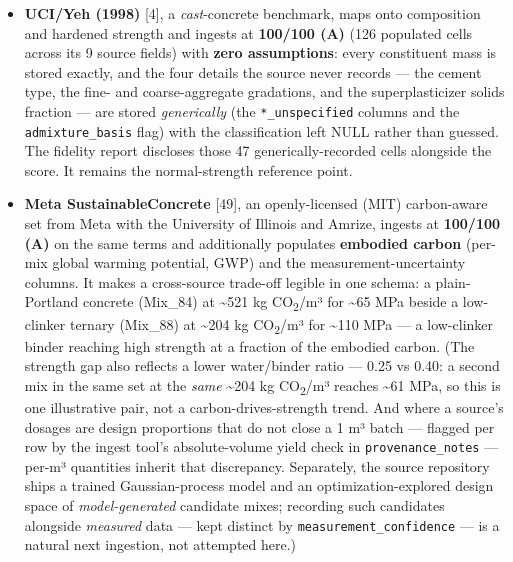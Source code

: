 \documentclass[
  11pt,
  letterpaper,
]{article}
\providecommand{\tightlist}{%
  \setlength{\itemsep}{0pt}\setlength{\parskip}{0pt}}
\begin{document}
\begin{itemize}
\tightlist
\item
  \textbf{UCI/Yeh (1998)} {[}4{]}, a \emph{cast}-concrete benchmark,
  maps onto composition and hardened strength and ingests at
  \textbf{100/100 (A)} (126 populated cells across its 9 source fields)
  with \textbf{zero assumptions}: every constituent mass is stored
  exactly, and the four details the source never records --- the cement
  type, the fine- and coarse-aggregate gradations, and the
  superplasticizer solids fraction --- are stored \emph{generically}
  (the \texttt{*\_unspecified} columns and the \texttt{admixture\_basis}
  flag) with the classification left NULL rather than guessed. The
  fidelity report discloses those 47 generically-recorded cells
  alongside the score. It remains the normal-strength reference point.
\item
  \textbf{Meta SustainableConcrete} {[}49{]}, an openly-licensed (MIT)
  carbon-aware set from Meta with the University of Illinois and Amrize,
  ingests at \textbf{100/100 (A)} on the same terms and additionally
  populates \textbf{embodied carbon} (per-mix global warming potential,
  GWP) and the measurement-uncertainty columns. It makes a cross-source
  trade-off legible in one schema: a plain-Portland concrete (Mix\_84)
  at \textasciitilde521 kg CO\textsubscript{2}/m³ for \textasciitilde65
  MPa beside a low-clinker ternary (Mix\_88) at \textasciitilde204 kg
  CO\textsubscript{2}/m³ for \textasciitilde110 MPa --- a low-clinker
  binder reaching high strength at a fraction of the embodied carbon.
  (The strength gap also reflects a lower water/binder ratio --- 0.25 vs
  0.40: a second mix in the same set at the \emph{same}
  \textasciitilde204 kg CO\textsubscript{2}/m³ reaches \textasciitilde61
  MPa, so this is one illustrative pair, not a carbon-drives-strength
  trend. And where a source's dosages are design proportions that do not
  close a 1 m³ batch --- flagged per row by the ingest tool's
  absolute-volume yield check in \texttt{provenance\_notes} --- per-m³
  quantities inherit that discrepancy. Separately, the source repository
  ships a trained Gaussian-process model and an optimization-explored
  design space of \emph{model-generated} candidate mixes; recording such
  candidates alongside \emph{measured} data --- kept distinct by
  \texttt{measurement\_confidence} --- is a natural next ingestion, not
  attempted here.)
\end{itemize}
\end{document}
